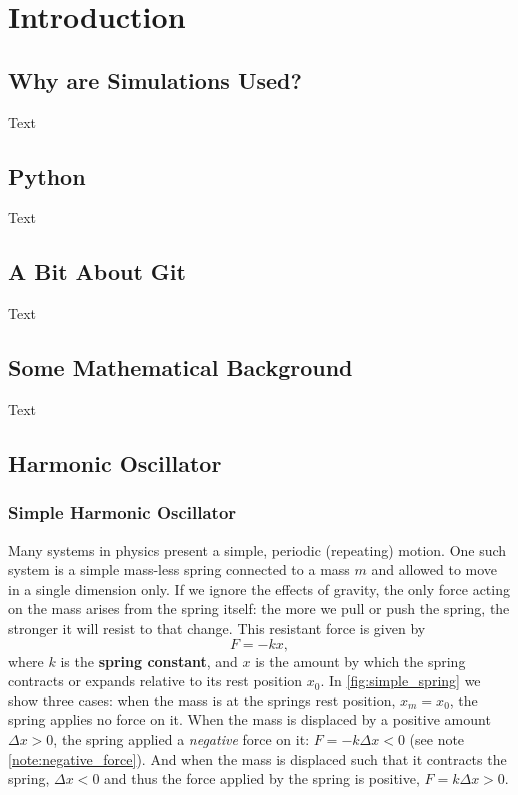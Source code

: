 \chapter{Introduction}

\section{Why are Simulations Used?}
Text

\section{Python}
Text
\section{A Bit About Git}
Text

\section{Some Mathematical Background}
Text

\section{Harmonic Oscillator}
\subsection{Simple Harmonic Oscillator}
Many systems in physics present a simple, periodic (repeating) motion. One such system is a simple mass-less spring connected to a mass $m$ and allowed to move in a single dimension only. If we ignore the effects of gravity, the only force acting on the mass arises from the spring itself: the more we pull or push the spring, the stronger it will resist to that change. This resistant force is given by
\begin{equation}
  F = -kx,
  \label{eq:spring_force}
\end{equation}
where $k$ is the \textbf{spring constant}, and $x$ is the amount by which the spring contracts or expands relative to its rest position $x_{0}$. In \autoref{fig:simple_spring} we show three cases: when the mass is at the springs rest position, $x_{m}=x_{0}$, the spring applies no force on it. When the mass is displaced by a positive amount $\Delta x>0$, the spring applied a \textit{negative} force on it: $F=-k\Delta x<0$ (see note \autoref{note:negative_force}). And when the mass is displaced such that it contracts the spring, $\Delta x<0$ and thus the force applied by the spring is positive, $F=k\Delta x>0$.

